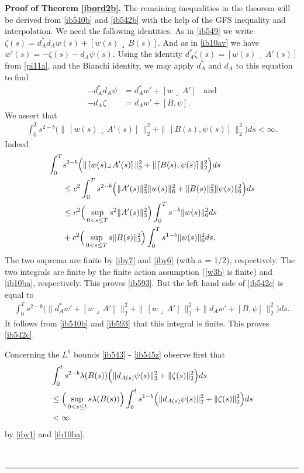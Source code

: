 \documentclass[12pt]{article}
\newenvironment{proof}[1][Proof]{\textbf{#1.} }{\ \rule{0.5em}{0.5em}}
\def \({\Big(}
\def \){\Big)}
\def \eref{\eqref}
\def \lrc{\lrcorner\,}
\numberwithin{equation}{section}
\begin{document}
\begin{proof}[Proof of Theorem \ref{ibord2b}]
       The  remaining inequalities in the theorem will be derived from  \eref{ib540b} and \eref{ib542b}
        with the help of the GFS inequality and interpolation. We need the following identities. As in \eref{ib549}
       we write $\zeta(s) = d_A^* d_A w(s) + [w(s)\lrc B(s)]$.  And as in \eref{ib10av} we have  
     $ w'(s) = -\zeta(s) - d_A \psi(s)$. 
             Using the identity $d_A^* \zeta(s) = [w(s) \lrc A'(s)]$ from   \eref{pi11a}, and the Bianchi identity,
              we may apply  $d_A^*$ and $d_A$ to this equation to find
              \begin{align}
              -d_A^*d_A \psi &=  d_A^* w'   + [w\lrc A']\ \ \ \ \text{and}      \label{ib591}\\
              -d_A\zeta &= d_A w'  + [B,\psi].  \label{ib592}
              \end{align}               
 We assert that   
 \begin{align}
 \int_0^T s^{2-b}\( \|\, [w(s)\lrc A'(s)]\, \|_2^2    +\|\, [B(s), \psi(s)]\, \|_2^2 \)ds < \infty.    \label{ib593}
 \end{align}  
Indeed
\begin{align} 
\int_0^T &s^{2-b}\(  \|\, [w(s)\lrc A'(s)]\,\|_2^2  + \|\, [B(s), \psi(s)]\,\|_2^2\) ds  \notag\\
&\le c^2\int_0^T s^{2-b}\(  \|A'(s)\|_3^2 \|w(s)\|_6^2 +  \|B(s)\|_3^2 \|\psi(s)\|_6^2\)ds  \notag\\
&\le c^2 \Big(\sup_{0 < s\le T}s^2\|A'(s)\|_3^2 \Big)\int_0^T s^{-b} \| w(s)\|_6^2 ds   \notag\\
&+ c^2\Big(\sup_{0 < s \le T} s \|B(s)\|_3^2\Big) \int_0^T s^{1-b} \| \psi(s)\|_6^2 ds. \notag
\end{align}
The two suprema are finite by \eref{iby7} and \eref{iby6} (with a = 1/2), respectively.
The two integrals are finite by   the finite action assumption (\eref{w3b}  is finite) and    \eref{ib10ba}, respectively. This proves \eref{ib593}.   
But the left hand side of \eref{ib542c} is equal to
\begin{align}
\int_0^T  s^{2-b}\( \|d_A^* w'   + [w\lrc A']\, \|_2^2 + \|\, [w\lrc A']\,\|_2^2 + \| d_A w'  + [B,\psi]\, \|_2^2 \)ds.
\end{align}
It follows from \eref{ib540b} and \eref{ib593} that this integral is finite. This proves \eref{ib542c}.


Concerning the $L^6$ bounds \eref{ib543} - \eref{ib545z} observe first that
   \begin{align}
   &\int_0^t s^{2-b} \lambda(B(s)) \(\| d_{A(s)} \psi(s)\|_2^2 + \|\zeta(s)\|_2^2\) ds  \notag\\
  &\le \Big(\sup_{0 < s \le t} s\lambda(B(s)) \Big) 
                    \int_0^t s^{1-b} \(\| d_{A(s)} \psi(s)\|_2^2 + \|\zeta(s)\|_2^2\)  ds\notag\\
     &< \infty                     
                      \label{ib570}
   \end{align}
   by  \eref{iby1} and \eref{ib10ba}.  
   


\end{proof}
\end{document}
